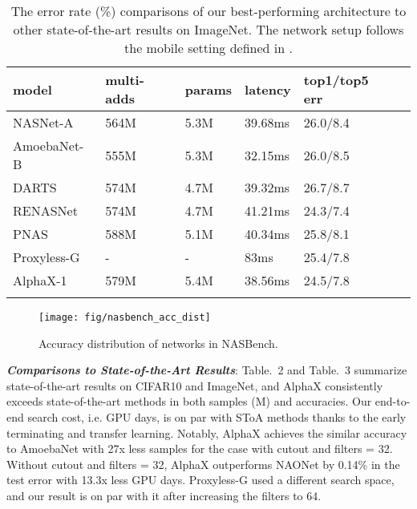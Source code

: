 \documentclass[10pt,twocolumn,letterpaper]{article}
\begin{document}
\begin{table}[t]
\setlength{\tabcolsep}{0.2em}

  \scriptsize
  \label{layers_used}
  \centering
  \begin{tabular}{ l l l l l l}
    \toprule
          \textbf{model} 							& \textbf{multi-adds}      & \textbf{params}& \textbf{latency} & \textbf{top1/top5 err}  \\
    \midrule
		  NASNet-A      \cite{zoph2017learning}     &    564M				   & 5.3M  &  39.68ms & 26.0/8.4 \\
		  AmoebaNet-B   \cite{real2018regularized}  &    555M                  & 5.3M  &  32.15ms & 26.0/8.5 \\
		  DARTS         \cite{liu2018darts}         &    574M                  & 4.7M  &  39.32ms & 26.7/8.7 \\
		  RENASNet      \cite{chen2019renas}        &    574M                  & 4.7M  &  41.21ms & 24.3/7.4 \\
		  PNAS          \cite{liu2017progressive}   &    588M                  & 5.1M  &  40.34ms    & 25.8/8.1 \\
		  Proxyless-G   \cite{cai2018proxylessnas}  &    -                     & -     &  83ms    & 25.4/7.8 \\
	\midrule
		  AlphaX-1  						        &   579M  & 5.4M & 38.56ms & 24.5/7.8   \\
    \bottomrule
    \label{acc-comps-imagenet}
  \end{tabular}
  \caption{The error rate (\%) comparisons of our best-performing architecture to other state-of-the-art results on ImageNet. The network setup follows the mobile setting defined in \cite{zoph2017learning}. }
  
  \vspace{-0.2in}
\end{table}



\begin{figure}
  \begin{center}
    \texttt{[image: fig/nasbench\_acc\_dist]}
  \end{center}
  \vspace{-0.3in}
  \caption{Accuracy distribution of networks in NASBench. }
  \label{fig:nasbench_acc_dist}
\end{figure}


\textit{\textbf{Comparisons to State-of-the-Art Results}}: Table.~2 and Table.~3 summarize state-of-the-art results on CIFAR10 and ImageNet, and AlphaX consistently exceeds state-of-the-art methods in both samples (M) and accuracies. Our end-to-end search cost, i.e. GPU days, is on par with SToA methods thanks to the early terminating and transfer learning. Notably, AlphaX achieves the similar accuracy to AmoebaNet with 27x less samples for the case with cutout and filters = 32. Without cutout and filters = 32, AlphaX outperforms NAONet by 0.14\% in the test error with 13.3x less GPU days. Proxyless-G used a different search space, and our result is on par with it after increasing the filters to 64.
\end{document}
